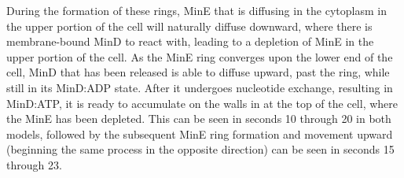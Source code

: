 \documentclass[letterpaper,twocolumn,amsmath,amssymb,pre]{revtex4-1}
\newcommand{\red}[1]{{\bf \color{red} #1}}
\newcommand{\fixme}[1]{\red{[#1]}}
\begin{document}
During the formation of these rings, MinE that is diffusing in the
cytoplasm in the upper portion of the cell will naturally diffuse
downward, where there is membrane-bound MinD to react with, leading to a
depletion of MinE in the upper portion of the cell.  As the MinE ring
converges upon the lower end of the cell, MinD that has been released
is able to diffuse upward, past the ring, while still in its MinD:ADP
state.  After it undergoes nucleotide exchange, resulting in MinD:ATP,
it is ready to accumulate on the walls in at the top of the
cell, where the MinE has been depleted.  This can be seen in seconds
10 through 20 in both models, followed by the subsequent MinE ring
formation and movement upward (beginning the same process in the
opposite direction) can be seen in seconds 15 through 23.



\end{document}
